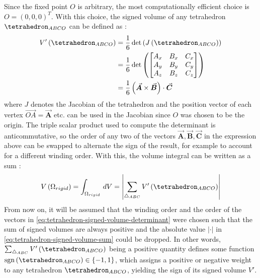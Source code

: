 \documentclass[oneside, a4paper]{book}
\newcommand\abs[1]{\left|#1\right|}
\newcommand\vek[1]{\vec{\bm{#1}}}
\newcommand\br[1]{\left(#1\right)}
\DeclareMathOperator{\sgn}{sgn}
\begin{document}
  Since the fixed point $O$ is arbitrary, the most computationally efficient choice is $O=\br{0,0,0}^T$. With this choice, the signed volume of any tetrahedron $\tetrahedron_{ABCO}$ can be defined as \autocites{efficient-feature-extraction}{explicit-exact-tetrahedron-formulas}:
  \begin{align}
    V'\br{\tetrahedron_{ABCO}} &= \frac{1}{6}\det\br{J\br{\tetrahedron_{ABCO}}}\\
    &= \frac{1}{6}\det\br{\begin{bmatrix}
    A_x&B_x&C_x\\A_y&B_y&C_y\\A_z&B_z&C_z
    \end{bmatrix}}\\
    &= \frac{1}{6}\br{\vek{A} \times \vek{B}} \cdot \vek{C}\label{eq:tetrahedron-signed-volume-determinant}
  \end{align}
  where $J$ denotes the Jacobian of the tetrahedron and the position vector of each vertex $\overrightarrow{OA}=\vek{A}$ etc. can be used in the Jacobian since $O$ was chosen to be the origin. The triple scalar product used to compute the determinant is anticommutative, so the order of any two of the vectors $\vek{A},\vek{B},\vek{C}$ in the expression above can be swapped to alternate the sign of the result, for example to account for a different winding order. With this, the volume integral can be written as a sum \autocite{efficient-feature-extraction}:
  \begin{equation}\label{eq:tetrahedron-signed-volume-sum}
    V\br{\Omega_{rigid}} = \int_{\Omega_{rigid}} \,dV = \abs{\sum_{\triangle_{ABC}} V'\br{\tetrahedron_{ABCO}}}
  \end{equation}
  From now on, it will be assumed that the winding order and the order of the vectors in \autoref{eq:tetrahedron-signed-volume-determinant} were chosen such that the sum of signed volumes are always positive and the absolute value $\abs{\cdot}$ in \autoref{eq:tetrahedron-signed-volume-sum} could be dropped. In other words, $\sum_{\triangle_{ABC}} V'\br{\tetrahedron_{ABCO}}$ being a positive quantity defines some function $\sgn\br{\tetrahedron_{ABCO}}\in\{-1,1\}$, which assigns a positive or negative weight to any tetrahedron $\tetrahedron_{ABCO}$, yielding the sign of its signed volume $V'$.
\end{document}
